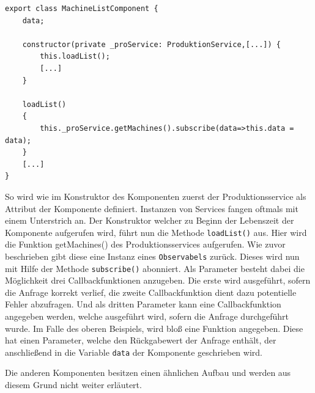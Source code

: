 \lstset{language=Java}
\begin{lstlisting}[float=htbp, caption={Anfragen von Daten}, label={lst:DataRequest}]
export class MachineListComponent {
	data;

	constructor(private _proService: ProduktionService,[...]) {
		this.loadList();
		[...]
	}
	
	loadList()
	{
		this._proService.getMachines().subscribe(data=>this.data = data);
	}
	[...]
}
\end{lstlisting}

So wird wie im Konstruktor des Komponenten zuerst der Produktionsservice als Attribut der Komponente definiert. Instanzen von Services fangen oftmals mit einem Unterstrich an. Der Konstruktor welcher zu Beginn der Lebenszeit der Komponente aufgerufen wird, führt nun die Methode \texttt{loadList()} aus. Hier wird die Funktion getMachines() des Produktionsservices aufgerufen. Wie zuvor beschrieben gibt diese eine Instanz eines \texttt{Observabels} zurück. Dieses wird nun mit Hilfe der Methode \texttt{subscribe()} abonniert. Als Parameter besteht dabei die Möglichkeit drei Callbackfunktionen anzugeben. Die erste wird ausgeführt, sofern die Anfrage korrekt verlief, die zweite Callbackfunktion dient dazu potentielle Fehler abzufragen. Und als dritten Parameter kann eine Callbackfunktion angegeben werden, welche ausgeführt wird, sofern die Anfrage durchgeführt wurde.
Im Falle des oberen Beispiels, wird bloß eine Funktion angegeben. Diese hat einen Parameter, welche den Rückgabewert der Anfrage enthält, der anschließend in die Variable \texttt{data} der Komponente geschrieben wird. 


Die anderen Komponenten besitzen einen ähnlichen Aufbau und werden aus diesem Grund nicht weiter erläutert. 